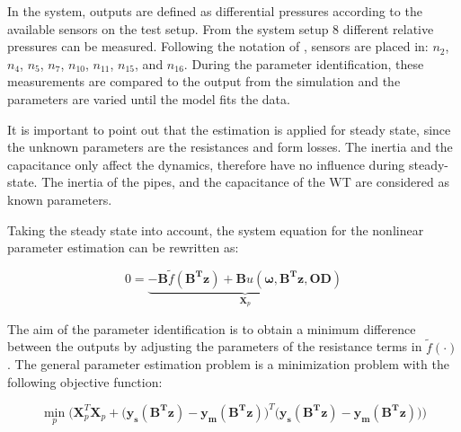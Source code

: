 In the system, outputs are defined as differential pressures according to the available sensors on the test setup. From the system setup $8$ different relative pressures can be measured. Following the notation of , sensors are placed in: 
$n_2$, $n_4$, $n_5$, $n_7$, $n_{10}$, $n_{11}$, $n_{15}$, and  $n_{16}$. During the parameter identification, these measurements are compared to the output from the simulation and the parameters are varied until the model fits the data.

It is important to point out that the estimation is applied for steady state, since the unknown parameters are the resistances and form losses. The inertia and the capacitance only affect the dynamics, therefore have no influence during steady-state. The inertia of the pipes, and the capacitance of the WT are considered as known parameters. 

Taking the steady state into account, the system equation for the nonlinear parameter estimation can be rewritten as: 

\begin{equation}
 0 = \underbrace {-\bm{B} \tilde f(\bm{B^T}\bm{z}) + \bm{B} u(\bm{\omega},\bm{B^T}\bm{z},\bm{OD}) }_{\mathcal{\bm{X}}_p}
 \label{InputOutputmodel_steadystate}
\end{equation}

The aim of the parameter identification is to obtain a minimum difference between the outputs by adjusting the parameters of the resistance terms in $\tilde{f}(\cdot)$. The general parameter estimation problem is a minimization problem with the following objective function: 

%
%
 \begin{equation}
 \min_{p} \Big(\mathcal{\bm{X}}_p^T \mathcal{\bm{X}}_p + \big(\bm{y_{s}(B^T z)} - \bm{y_{m}(B^T z)} \big)^T  \big(\bm{ y_{s}(B^T z)} - \bm{ y_{m}(B^T z)\big)}\Big)
  \label{ObjectiveFunction11}
 \end{equation}
 
